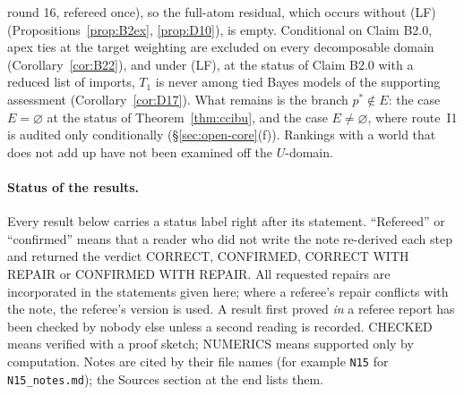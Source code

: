 \documentclass[11pt]{article}
\theoremstyle{definition}
\theoremstyle{remark}
\newcommand{\src}[1]{\texttt{#1}}
\begin{document}
round 16, refereed once), so the full-atom residual, which occurs without (LF) (Propositions~\ref{prop:B2ex}, \ref{prop:D10}), is empty. Conditional on Claim B2.0, apex ties at the target weighting are excluded on every decomposable domain (Corollary~\ref{cor:B22}), and under (LF), at the status of Claim B2.0 with a reduced list of imports, $T_1$ is never among tied Bayes models of the supporting assessment (Corollary~\ref{cor:D17}). What remains is the branch $p^*\notin E$: the case $E=\varnothing$ at the status of Theorem~\ref{thm:ccibu}, and the case $E\ne\varnothing$, where route~I1 is audited only conditionally (\S\ref{sec:open-core}(f)). Rankings with a world that does not add up have not been examined off the $U$-domain.

\paragraph{Status of the results.}
Every result below carries a status label right after its statement. ``Refereed'' or ``confirmed'' means that a reader who did not write the note re-derived each step and returned the verdict CORRECT, CONFIRMED, CORRECT WITH REPAIR or CONFIRMED WITH REPAIR. All requested repairs are incorporated in the statements given here; where a referee's repair conflicts with the note, the referee's version is used. A result first proved \emph{in} a referee report has been checked by nobody else unless a second reading is recorded. CHECKED means verified with a proof sketch; NUMERICS means supported only by computation. Notes are cited by their file names (for example \src{N15} for \src{N15\_notes.md}); the Sources section at the end lists them.
\end{document}
